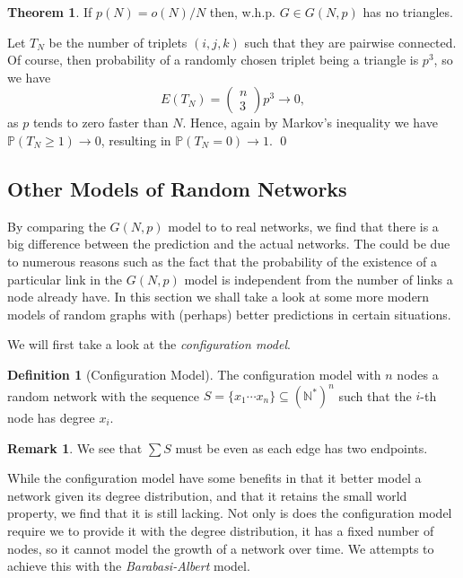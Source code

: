 \documentclass[
]{article}
\theoremstyle{definition}
\newtheorem{theorem}{Theorem}
\newtheorem*{remark}{Remark}
\theoremstyle{definition}
\newtheorem{definition}{Definition}[section]
\begin{document}
\begin{theorem}
  If \(p(N) = o(N) / N\) then, w.h.p. \(G \in G(N, p)\) has no triangles.
\end{theorem}
\proof

Let \(T_N\) be the number of triplets \((i, j ,k)\) such that they are
pairwise connected. Of course, then probability of a randomly chosen
triplet being a triangle is \(p^3\), so we have
\[E(T_N) = \begin{pmatrix} n \\ 3 \end{pmatrix} p^3 \to 0,\] as \(p\)
tends to zero faster than \(N\). Hence, again by Markov's inequality we
have \(\mathbb{P}(T_N \ge 1) \to 0\), resulting in
\(\mathbb{P}(T_N = 0) \to 1\). \qed

\hypertarget{other-models-of-random-networks}{%
\subsection{Other Models of Random
Networks}\label{other-models-of-random-networks}}

By comparing the \(G(N, p)\) model to to real networks, we find that
there is a big difference between the prediction and the actual
networks. The could be due to numerous reasons such as the fact that the
probability of the existence of a particular link in the \(G(N, p)\)
model is independent from the number of links a node already have. In
this section we shall take a look at some more modern models of random
graphs with (perhaps) better predictions in certain situations.

We will first take a look at the \emph{configuration model}.

\begin{definition}[Configuration Model]
  The configuration model with \(n\) nodes a random network with the
  sequence \(S = \{x_1 \cdots x_n\} \subseteq (\mathbb{N}^*)^n\) such that the 
  \(i\)-th node has degree \(x_i\).
\end{definition}

\begin{remark}
  We see that \(\sum S\) must be even as each edge has two endpoints.
\end{remark}

While the configuration model have some benefits in that it better model
a network given its degree distribution, and that it retains the small
world property, we find that it is still lacking. Not only is does the
configuration model require we to provide it with the degree
distribution, it has a fixed number of nodes, so it cannot model the
growth of a network over time. We attempts to achieve this with the
\emph{Barabasi-Albert} model.
\end{document}
